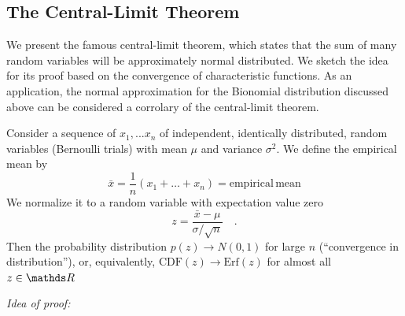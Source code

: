 \documentclass{notebook}
\begin{document}

\subsection{The Central-Limit Theorem}

We present the famous central-limit theorem, 
which states that the sum of many random variables will be approximately normal distributed.
We sketch the idea for its proof based on the convergence of characteristic functions.
As an application,
the normal approximation for the Bionomial distribution discussed above
can be considered a corrolary of the central-limit theorem.

\begin{theorem}
	Consider a sequence of $x_1, ... x_n$ of independent, identically distributed, random variables (Bernoulli trials)
	with mean $\mu$ and variance $\sigma^2$. We define the empirical mean by
	\begin{equation}
	\bar{x} = \frac{1}{n}(x_1 + \dots + x_n) = \mathrm{empirical \, mean}
	\end{equation}
	We normalize it to a random variable with expectation value zero
	\begin{equation}
	z = \frac{\bar{x}-\mu}{\sigma/\sqrt{n}} \quad.
	\end{equation}
Then the probability distribution $p(z) \to N(0,1)$ for large $n$ (``convergence in distribution''), 
or, equivalently, 
$\mathrm{CDF}(z) \to \mathrm{Erf}(z)$ for almost all $z \in \R$	
\end{theorem}

\textit{Idea of proof:}
\end{document}
